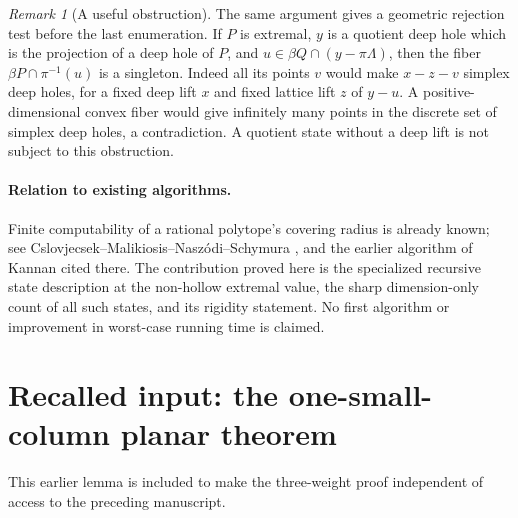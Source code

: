 \documentclass[11pt,a4paper]{article}
\theoremstyle{remark}\newtheorem{remark}[theorem]{Remark}
\begin{document}
\begin{remark}[A useful obstruction]
The same argument gives a geometric rejection test before the
last enumeration. If $P$ is extremal, $y$ is a quotient deep hole
which is the projection of a deep hole of $P$, and
$u\in\beta Q\cap(y-\pi\Lambda)$, then the fiber
$\beta P\cap\pi^{-1}(u)$ is a singleton. Indeed all its points
$v$ would make $x-z-v$ simplex deep holes, for a fixed deep lift
$x$ and fixed lattice lift $z$ of $y-u$. A positive-dimensional
convex fiber would give infinitely many points in the discrete
set of simplex deep holes, a contradiction. A quotient state
without a deep lift is not subject to this obstruction.
\end{remark}

\paragraph{Relation to existing algorithms.}
Finite computability of a rational polytope's covering radius is
already known; see Cslovjecsek--Malikiosis--Nasz\'odi--Schymura
\cite{ComputingRadius}, and the earlier algorithm of Kannan cited
there. The contribution proved here is the specialized recursive
state description at the non-hollow extremal value, the sharp
dimension-only count of all such states, and its rigidity statement.
No first algorithm or improvement in worst-case running time is
claimed.


\appendix
\section{Recalled input: the one-small-column planar theorem}
\label{app:onesmall}
This earlier lemma is included to make the three-weight proof
independent of access to the preceding manuscript.
\end{document}
